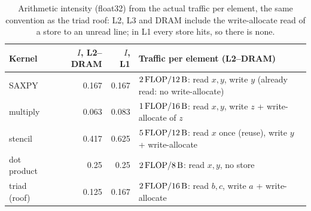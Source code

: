 \begin{table}[tbp]
  \centering\small
  \caption{Arithmetic intensity (float32) from the actual traffic per element, the same convention
  as the triad roof: L2, L3 and DRAM include the write-allocate read of a store to an unread line;
  in L1 every store hits, so there is none.}\label{tab:roofline-inputs}
  \begin{tabularx}{\linewidth}{@{}lrrX@{}}
    \toprule
    Kernel & $I$, L2--DRAM & $I$, L1 & Traffic per element (L2--DRAM) \\
    \midrule
    SAXPY        & \num{0.167} & \num{0.167} & $2\,\text{FLOP} / \qty{12}{\byte}$: read $x,y$, write $y$ (already read: no write-allocate) \\
    multiply     & \num{0.063} & \num{0.083} & $1\,\text{FLOP} / \qty{16}{\byte}$: read $x,y$, write $z$ + write-allocate of $z$ \\
    stencil      & \num{0.417} & \num{0.625} & $5\,\text{FLOP} / \qty{12}{\byte}$: read $x$ once (reuse), write $y$ + write-allocate \\
    dot product  & \num{0.25}  & \num{0.25}  & $2\,\text{FLOP} / \qty{8}{\byte}$: read $x,y$, no store \\
    triad (roof) & \num{0.125} & \num{0.167} & $2\,\text{FLOP} / \qty{16}{\byte}$: read $b,c$, write $a$ + write-allocate \\
    \bottomrule
  \end{tabularx}
\end{table}

